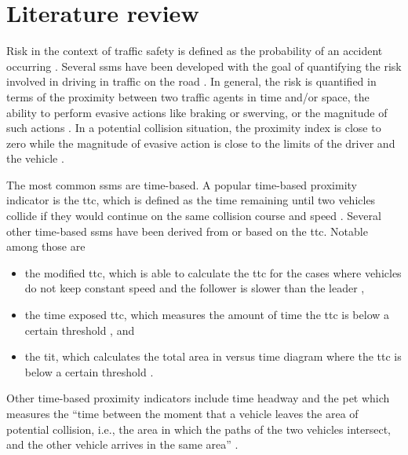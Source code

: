\section{Literature review}
\label{sec:literature review}

Risk in the context of traffic safety is defined as the probability of an accident occurring \autocite{hakkert2002uses}.
Several \acp{ssm} have been developed with the goal of quantifying the risk involved in driving in traffic on the road \autocite{minderhoud2001extended, ozbay2008derivation, cunto2009simulated, laureshyn2010evaluation}.
In general, the risk is quantified in terms of the proximity between two traffic agents in time and/or space, the ability to perform evasive actions like braking or swerving, or the magnitude of such actions \autocite{shi2018key,zheng2020modeling}. 
In a potential collision situation, the proximity index is close to zero while the magnitude of evasive action is close to the limits of the driver and the vehicle \autocite{zheng2020modeling}. 

The most common \acp{ssm} are time-based. 
A popular time-based proximity indicator is the \ac{ttc}, which is defined as the time remaining until two vehicles collide if they would continue on the same collision course and speed \autocite{hayward1972near}. 
Several other time-based \acp{ssm} have been derived from or based on the \ac{ttc}. 
Notable among those are 
\begin{itemize}
    \item the modified \ac{ttc}, which is able to calculate the \ac{ttc} for the cases where vehicles do not keep constant speed and the follower is slower than the leader \autocite{ozbay2008derivation},
    \item the time exposed \ac{ttc}, which measures the amount of time the \ac{ttc} is below a certain threshold \autocite{minderhoud2001extended}, and
    \item the \ac{tit}, which calculates the total area in  versus time diagram where the \ac{ttc} is below a certain threshold  \autocite{minderhoud2001extended}. 
\end{itemize}
Other time-based proximity indicators include time headway and the \ac{pet} which measures the ``time between the moment that a vehicle leaves the area of potential collision, i.e., the area in which the paths of the two vehicles intersect, and the other vehicle arrives in the same area'' \autocite{mahmud2017application}. 

